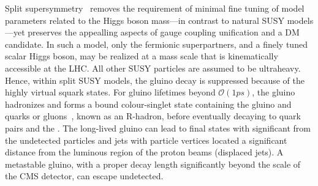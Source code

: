 Split supersymmetry~\cite{ArkaniHamed:2004fb, Giudice:2004tc} removes
the requirement of minimal fine tuning of model parameters related to
the Higgs boson mass---in contrast to natural SUSY models---yet
preserves the appealling aspects of gauge coupling unification and a
DM candidate. In such a model, only the fermionic superpartners, and a
finely tuned scalar Higgs boson, may be realized at a mass scale that
is kinematically accessible at the LHC. All other SUSY particles are
assumed to be ultraheavy. Hence, within split SUSY models, the gluino
decay is suppressed because of the highly virtual squark states. For
gluino lifetimes beyond $\mathcal{O}(1\unit{ps})$, the gluino
hadronizes and forms a bound colour-singlet state containing the
gluino and quarks or gluons~\cite{Fairbairn:2006gg}, known as an
R-hadron, before eventually decaying to quark pairs and the
\PSGczDo. The long-lived gluino can lead to final states with
significant \ptvecmiss from the undetected \PSGczDo particles and jets
with particle vertices located a significant distance from the
luminous region of the proton beams (displaced jets). A metastable
gluino, with a proper decay length significantly beyond the scale of
the CMS detector, can escape undetected.


